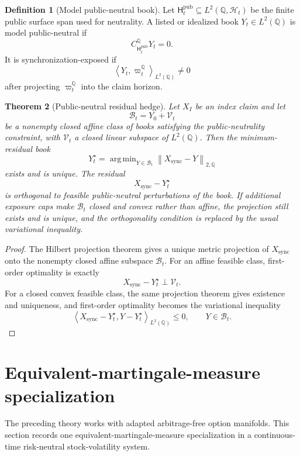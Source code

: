 \documentclass[11pt,a4paper]{amsart}
\theoremstyle{plain}
\newtheorem{theorem}{Theorem}[section]
\theoremstyle{definition}
\newtheorem{definition}[theorem]{Definition}
\theoremstyle{remark}
\DeclareMathOperator{\argmin}{arg\,min}
\newcommand{\QQ}{\mathbb{Q}}
\newcommand{\cB}{\mathcal{B}}
\newcommand{\cH}{\mathcal{H}}
\newcommand{\cV}{\mathcal{V}}
\newcommand{\norm}[1]{\left\lVert #1\right\rVert}
\newcommand{\ip}[2]{\left\langle #1,#2\right\rangle}
\begin{document}
\begin{definition}[Model public-neutral book]\label{def:model-public-neutral-book}
Let \(\mathsf H_t^{\mathrm{pub}}\subseteq L^2(\QQ,\cH_t)\) be the finite public surface span used
for neutrality.  A listed or idealized book \(Y_t\in L^2(\QQ)\) is model public-neutral if
\[
        C_{\mathsf H_t^{\mathrm{pub}}}^\QQ Y_t=0.
\]
It is synchronization-exposed if
\[
        \ip{Y_t}{\varpi_t^\QQ}_{L^2(\QQ)}\ne0
\]
after projecting \(\varpi_t^\QQ\) into the claim horizon.
\end{definition}

\begin{theorem}[Public-neutral residual hedge]\label{thm:public-neutral-hedge}
Let \(X_I\) be an index claim and let
\[
        \cB_t=Y_0+\cV_t
\]
be a nonempty closed affine class of books satisfying the public-neutrality constraint, with
\(\cV_t\) a closed linear subspace of \(L^2(\QQ)\).  Then the minimum-residual book
\[
        Y_t^\star
        =
        \argmin_{Y\in\cB_t}
        \norm{X_{\mathrm{sync}}-Y}_{2,\QQ}
\]
exists and is unique.  The residual
\[
        X_{\mathrm{sync}}-Y_t^\star
\]
is orthogonal to feasible public-neutral perturbations of the book.
If additional exposure caps make \(\cB_t\) closed and convex rather than affine, the projection
still exists and is unique, and the orthogonality condition is replaced by the usual variational
inequality.
\end{theorem}

\begin{proof}
The Hilbert projection theorem gives a unique metric projection of \(X_{\mathrm{sync}}\) onto the
nonempty closed affine subspace \(\cB_t\).  For an affine feasible class, first-order optimality
is exactly
\[
        X_{\mathrm{sync}}-Y_t^\star\perp \cV_t .
\]
For a closed convex feasible class, the same projection theorem gives existence and uniqueness,
and first-order optimality becomes the variational inequality
\[
        \ip{X_{\mathrm{sync}}-Y_t^\star}{Y-Y_t^\star}_{L^2(\QQ)}\le0,
        \qquad Y\in\cB_t .
\]
\end{proof}

\section{Equivalent-martingale-measure specialization}\label{sec:emm}

The preceding theory works with adapted arbitrage-free option manifolds.  This section records one
equivalent-martingale-measure specialization in a continuous-time risk-neutral stock-volatility
system.
\end{document}
